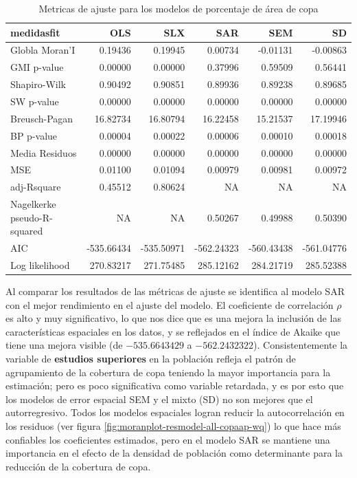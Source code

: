 \documentclass[12pt,]{book}
\begin{document}
\begin{table}

\caption{\label{tab:tabla-comp-modelos-copaap}Metricas de ajuste para los modelos de porcentaje de área de copa}
\centering
\begin{tabular}[t]{l|r|r|r|r|r}
\hline
medidasfit & OLS & SLX & SAR & SEM & SD\\
\hline
Globla Moran'I & 0.19436 & 0.19945 & 0.00734 & -0.01131 & -0.00863\\
\hline
GMI p-value & 0.00000 & 0.00000 & 0.37996 & 0.59509 & 0.56441\\
\hline
Shapiro-Wilk & 0.90492 & 0.90851 & 0.89936 & 0.89238 & 0.89685\\
\hline
SW p-value & 0.00000 & 0.00000 & 0.00000 & 0.00000 & 0.00000\\
\hline
Breusch-Pagan & 16.82734 & 16.80794 & 16.22458 & 15.21537 & 17.19946\\
\hline
BP p-value & 0.00004 & 0.00022 & 0.00006 & 0.00010 & 0.00018\\
\hline
Media Residuos & 0.00000 & 0.00000 & 0.00000 & 0.00000 & 0.00000\\
\hline
MSE & 0.01100 & 0.01094 & 0.00979 & 0.00981 & 0.00972\\
\hline
adj-Rsquare & 0.45512 & 0.80624 & NA & NA & NA\\
\hline
Nagelkerke pseudo-R-squared & NA & NA & 0.50267 & 0.49988 & 0.50390\\
\hline
AIC & -535.66434 & -535.50971 & -562.24323 & -560.43438 & -561.04776\\
\hline
Log likelihood & 270.83217 & 271.75485 & 285.12162 & 284.21719 & 285.52388\\
\hline
\end{tabular}
\end{table}

Al comparar los resultados de las métricas de ajuste se identifica al
modelo SAR con el mejor rendimiento en el ajuste del modelo. El
coeficiente de correlación \(\rho\) es alto y muy significativo, lo que
nos dice que es una mejora la inclusión de las características
espaciales en los datos, y se reflejados en el índice de Akaike que
tiene una mejora visible (de \(-535.6643429\) a \(-562.2432322\)).
Consistentemente la variable de \textbf{estudios superiores} en la
población refleja el patrón de agrupamiento de la cobertura de copa
teniendo la mayor importancia para la estimación; pero es poco
significativa como variable retardada, y es por esto que los modelos de
error espacial SEM y el mixto (SD) no son mejores que el autorregresivo.
Todos los modelos espaciales logran reducir la autocorrelación en los
residuos (ver figura \ref{fig:moranplot-resmodel-all-copaap-wq}) lo que
hace más confiables los coeficientes estimados, pero en el modelo SAR se
mantiene una importancia en el efecto de la densidad de población como
determinante para la reducción de la cobertura de copa.
\end{document}
